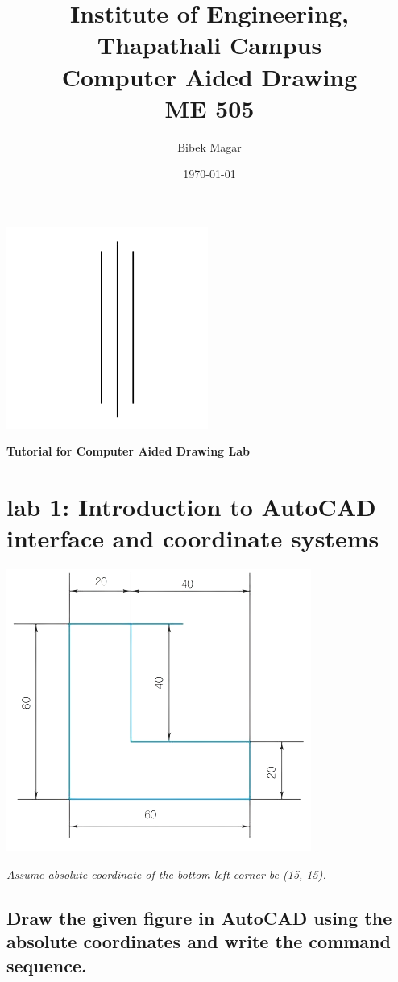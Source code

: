 \documentclass[a4paper, 12pt]{article}
\title{Institute of Engineering,\\ Thapathali Campus \\ Computer Aided Drawing \\ ME 505} %
\author{Bibek Magar}
\date{\today} %
\begin{document}
\maketitle %
	\begin{center}
		\includegraphics{gfx/lines.png}
	\end{center}
	\begin{center}
		\textbf{Tutorial for Computer Aided Drawing Lab}
	\end{center}
	
	\newpage
\section{lab 1: Introduction to AutoCAD interface and coordinate systems}
\begin{center}
	\includegraphics{gfx/fig.png}
\end{center}
\emph{Assume absolute coordinate of the bottom left corner be (15, 15).}
\subsection{Draw the given figure in AutoCAD using the absolute coordinates and write the command sequence.}
\end{document}
